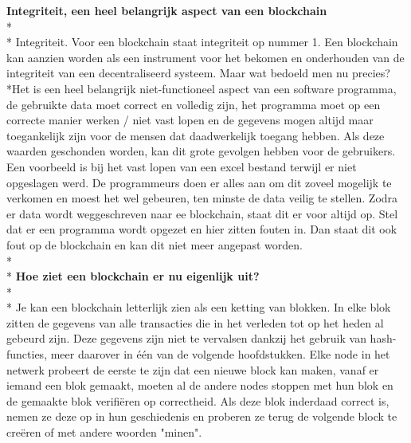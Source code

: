 \documentclass[fleqn,a4paper,12pt]{book}
\begin{document}
\textbf{Integriteit, een heel belangrijk aspect van een blockchain}\\*\\*
Integriteit. Voor een blockchain staat integriteit op nummer 1. Een blockchain kan aanzien worden als een instrument voor het bekomen en onderhouden van de integriteit van een decentraliseerd systeem. Maar wat bedoeld men nu precies?\\*Het is een heel belangrijk niet-functioneel aspect van een software programma, de gebruikte data moet correct en volledig zijn, het programma moet op een correcte manier werken / niet vast lopen en de gegevens mogen altijd maar toegankelijk zijn voor de mensen dat daadwerkelijk toegang hebben. Als deze waarden geschonden worden, kan dit grote gevolgen hebben voor de gebruikers. Een voorbeeld is bij het vast lopen van een excel bestand terwijl er niet opgeslagen werd. De programmeurs doen er alles aan om dit zoveel mogelijk te verkomen en moest het wel gebeuren, ten minste de data veilig te stellen. Zodra er data wordt weggeschreven naar ee blockchain, staat dit er voor altijd op. Stel dat er een programma wordt opgezet en hier zitten fouten in. Dan staat dit ook fout op de blockchain en kan dit niet meer angepast worden.\\*\\*
\textbf{Hoe ziet een blockchain er nu eigenlijk uit?}\\*\\*
Je kan een blockchain letterlijk zien als een ketting van blokken. In elke blok zitten de gegevens van alle transacties die in het verleden tot op het heden al gebeurd zijn. Deze gegevens zijn niet te vervalsen dankzij het gebruik van hash-functies, meer daarover in één van de volgende hoofdstukken. Elke node in het netwerk probeert de eerste te zijn dat een nieuwe block kan maken, vanaf er iemand een blok gemaakt, moeten al de andere nodes stoppen met hun blok en de gemaakte blok verifiëren op correctheid. Als deze blok inderdaad correct is, nemen ze deze op in hun geschiedenis en proberen ze terug de volgende block te creëren of met andere woorden "minen".
\end{document}
